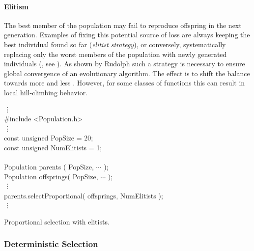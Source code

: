         \paragraph{Elitism}

The best member of the population may fail to reproduce offspring in
the next generation.  Examples of fixing this potential source of loss
are always keeping the best individual found so far (\emph{elitist
strategy}), or conversely, systematically replacing only the worst
members of the population with newly generated individuals
(\emph{}, see
).  As shown by
Rudolph \cite{Rudolph:94} such a strategy is necessary to ensure
global convergence of an evolutionary algorithm.  The effect is to
shift the balance towards more  and less
.
However, for some classes of functions this can result in local
hill-climbing behavior.

\begin{example}[htb]
\begin{shortlisting}
            \vdots\\
\#include <Population.h>\\
            \vdots\\
const unsigned PopSize     = 20;\\
const unsigned NumElitists = 1;\\
\\
Population parents   ( PopSize, $\cdots$ );\\
Population offsprings( PopSize, $\cdots$ );\\
            \vdots\\
parents.selectProportional( offsprings, NumElitists );\\
            \vdots\\
\end{shortlisting}
\vspace{-10pt}\caption[Proportional Selection with Elitists]{
    Proportional selection with elitists.
}
\end{example}



        \subsubsection{Deterministic Selection}
        \label{selection:subsubs:deterministicSelection}

